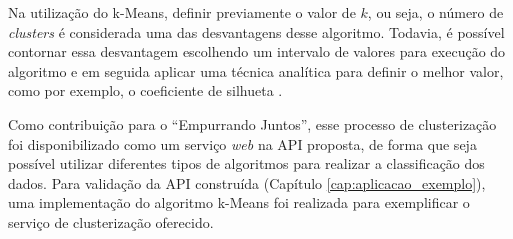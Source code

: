 Na utilização do k-Means, definir previamente o valor de $k$, ou seja, o número de \textit{clusters} é considerada uma das desvantagens desse algoritmo. Todavia,
é possível contornar essa desvantagem escolhendo um intervalo de valores para execução do algoritmo e em seguida aplicar
uma técnica analítica para definir o melhor valor, como por exemplo, o coeficiente de silhueta \cite{han2011data}.

Como contribuição para o ``Empurrando Juntos'', esse processo de clusterização foi disponibilizado como um serviço
\textit{web} na API proposta, de forma que seja possível utilizar diferentes tipos de algoritmos para realizar a classificação dos dados.
Para validação da API construída (Capítulo \ref{cap:aplicacao_exemplo}), uma implementação do algoritmo k-Means
foi realizada para exemplificar o serviço de clusterização oferecido.



